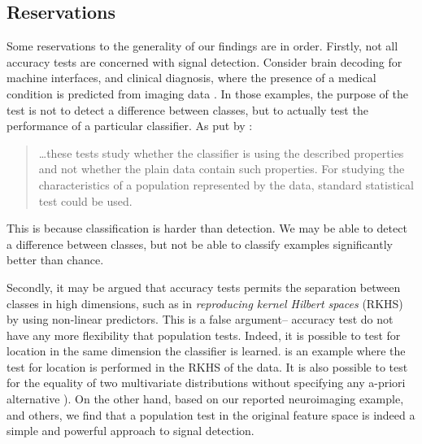 \documentclass[12pt,a4paper]{article}
\theoremstyle{definition}
\begin{document}
\subsection{Reservations}
\label{sec:reservations}

Some reservations to the generality of our findings are in order. 
Firstly, not all accuracy tests are concerned with signal detection.
Consider brain decoding for machine interfaces, and clinical diagnosis, where the presence of a medical condition is predicted from imaging data \citep[e.g.][]{olivetti_induction_2012,wager_fmri-based_2013}. 
In those examples, the purpose of the test is not to detect a difference between classes, but to actually test the performance of a particular classifier.  
As put by \cite{ojala_permutation_2010}:
\begin{quote}
	\dots these tests study whether the classifier is using the described properties and not whether
	the plain data contain such properties. For studying the characteristics of a population represented
	by the data, standard statistical test could be used.
\end{quote}
This is because classification is harder than detection. 
We may be able to detect a difference between classes, but not be able to classify examples significantly better than chance. 

Secondly, it may be argued that accuracy tests permits the separation between classes in high dimensions, such as in \emph{reproducing kernel Hilbert spaces} (RKHS) by using non-linear predictors. 
This is a false argument-- accuracy test do not have any more flexibility that population tests. 
Indeed, it is possible to test for location in the same dimension the classifier is learned. 
\citet{gretton_kernel_2012-1} is an example where the test for location is performed in the RKHS of the data.
It is also possible to test for the equality of two multivariate distributions without specifying any a-priori alternative \cite[e.g.][]{heller_consistent_2012}).
On the other hand, based on our reported neuroimaging example, and others, we find that a population test in the original feature space is indeed a simple and powerful approach to signal detection.
\end{document}
